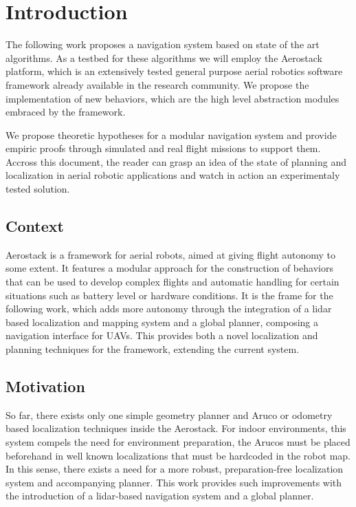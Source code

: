 \chapter{Introduction} \label{ch_1:chapter}

  The following work proposes a navigation system based on state of the art algorithms. As a testbed for these algorithms we will employ the Aerostack platform, which is an extensively tested general purpose aerial robotics software framework already available in the research community. We propose the implementation of new behaviors, which are the high level abstraction modules embraced by the framework.

  We propose theoretic hypotheses for a modular navigation system and provide empiric proofs through simulated and real flight missions to support them. Accross this document, the reader can grasp an idea of the state of planning and localization in aerial robotic applications and watch in action an experimentaly tested solution.

  \section{Context}

    Aerostack is a framework for aerial robots, aimed at giving flight autonomy to some extent. It features a modular approach for the construction of behaviors that can be used to develop complex flights and automatic handling for certain situations such as battery level or hardware conditions. It is the frame for the following work, which adds more autonomy through the integration of a lidar based localization and mapping system and a global planner, composing a navigation interface for UAVs. This provides both a novel localization and planning techniques for the framework, extending the current system.

  \section{Motivation}

    So far, there exists only one simple geometry planner and Aruco or odometry based localization techniques inside the Aerostack. For indoor environments, this system compels the need for environment preparation, the Arucos must be placed beforehand in well known localizations that must be hardcoded in the robot map. In this sense, there exists a need for a more robust, preparation-free localization system and accompanying planner. This work provides such improvements with the introduction of a lidar-based navigation system and a global planner.


